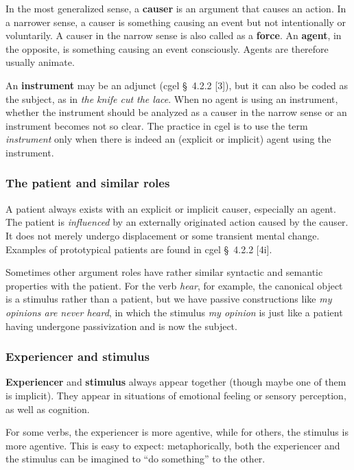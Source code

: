 \documentclass{article}
\newcommand*{\citesec}[1]{\S~{#1}}
\newcommand*{\concept}[1]{\textbf{#1}}
\newcommand*{\term}[1]{\emph{#1}}
\newcommand*{\corpus}[1]{\emph{#1}}
\begin{document}
In the most generalized sense,
a \concept{causer} is an argument that causes an action. 
In a narrower sense, a causer is something causing an event but not intentionally or voluntarily.
A causer in the narrow sense is also called as a \concept{force}.
An \concept{agent}, in the opposite, is something causing an event consciously.
Agents are therefore usually animate.

An \concept{instrument} may be an adjunct (\ac{cgel} \citesec{4.2.2} [3]),
but it can also be coded as the subject, 
as in \corpus{the knife cut the lace}.
When no agent is using an instrument, 
whether the instrument should be analyzed as a causer in the narrow sense or an instrument
becomes not so clear.
The practice in \ac{cgel} is to use the term \term{instrument} only when 
there is indeed an (explicit or implicit) agent using the instrument.

\subsubsection{The patient and similar roles}

A patient always exists with an explicit or implicit causer, especially an agent.
The patient is \emph{influenced} by an externally originated action caused by the causer.
It does not merely undergo displacement or some transient mental change. 
Examples of prototypical patients are found in \ac{cgel} \citesec{4.2.2} [4i].

Sometimes other argument roles have rather similar syntactic and semantic properties with the patient.
For the verb \corpus{hear}, for example,
the canonical object is a stimulus rather than a patient,
but we have passive constructions like \corpus{my opinions are never heard},
in which the stimulus \corpus{my opinion} is just like 
a patient having undergone passivization and is now the subject.

\subsubsection{Experiencer and stimulus}

\concept{Experiencer} and \concept{stimulus} always appear together (though maybe one of them is implicit).
They appear in situations of emotional feeling or sensory perception, as well as cognition.

For some verbs, the experiencer is more agentive, while for others, the stimulus is more agentive.
This is easy to expect:
metaphorically, both the experiencer and the stimulus can be imagined to ``do something'' to the other.
\end{document}
